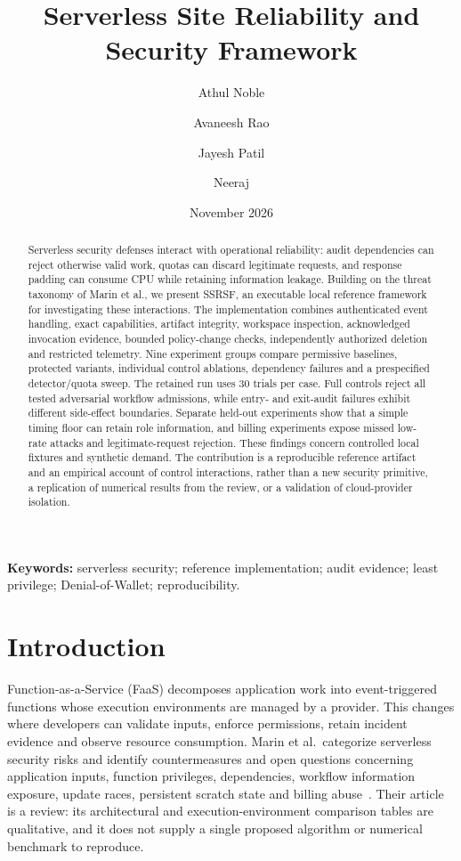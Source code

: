 \documentclass[11pt,a4paper]{article}
\title{Serverless Site Reliability and Security Framework}
\author{Athul Noble \and Avaneesh Rao \and Jayesh Patil \and Neeraj}
\date{November 2026}
\newcommand{\TrialCount}{30}
\begin{document}
\maketitle
\begin{abstract}
Serverless security defenses interact with operational reliability: audit dependencies can reject otherwise valid work, quotas can discard legitimate requests, and response padding can consume CPU while retaining information leakage. Building on the threat taxonomy of Marin et al., we present SSRSF, an executable local reference framework for investigating these interactions. The implementation combines authenticated event handling, exact capabilities, artifact integrity, workspace inspection, acknowledged invocation evidence, bounded policy-change checks, independently authorized deletion and restricted telemetry. Nine experiment groups compare permissive baselines, protected variants, individual control ablations, dependency failures and a prespecified detector/quota sweep. The retained run uses \TrialCount{} trials per case. Full controls reject all tested adversarial workflow admissions, while entry- and exit-audit failures exhibit different side-effect boundaries. Separate held-out experiments show that a simple timing floor can retain role information, and billing experiments expose missed low-rate attacks and legitimate-request rejection. These findings concern controlled local fixtures and synthetic demand. The contribution is a reproducible reference artifact and an empirical account of control interactions, rather than a new security primitive, a replication of numerical results from the review, or a validation of cloud-provider isolation.
\end{abstract}
\noindent\textbf{Keywords:} serverless security; reference implementation; audit evidence; least privilege; Denial-of-Wallet; reproducibility.

\section{Introduction}
Function-as-a-Service (FaaS) decomposes application work into event-triggered functions whose execution environments are managed by a provider. This changes where developers can validate inputs, enforce permissions, retain incident evidence and observe resource consumption. Marin et al.\ categorize serverless security risks and identify countermeasures and open questions concerning application inputs, function privileges, dependencies, workflow information exposure, update races, persistent scratch state and billing abuse~\cite{marin}. Their article is a review: its architectural and execution-environment comparison tables are qualitative, and it does not supply a single proposed algorithm or numerical benchmark to reproduce.
\end{document}
